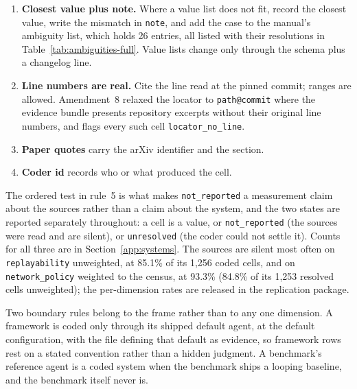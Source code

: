 \begin{enumerate}
\begin{enumerate}
    \texttt{medium} unless the documentation states the absence outright.
  \item \textbf{No, the evidence has no such place} (no config surface in the bundle, a truncated
    repository, or a paper only) $\rightarrow$ \texttt{not\_reported: true}, \texttt{value: null},
    and \texttt{note} names the place that was missing.
  \end{enumerate}
  The absence of a \emph{mention} is never evidence of absence: prose that does not discuss rollback
  is not evidence that rollback is absent. Equally, \texttt{not\_reported} is never correct once the
  place where the feature would be declared has been opened. This is the form rule~5 took under
  protocol amendment~9; the earlier form and the measured effect of the rewrite are reported in
  \S4.
\item \textbf{Closest value plus note.} Where a value list does not fit, record the closest value,
  write the mismatch in \texttt{note}, and add the case to the manual's ambiguity list, which holds
  26 entries, all listed with their resolutions in Table~\ref{tab:ambiguities-full}. Value lists change only through the schema plus a
  changelog line.
\item \textbf{Line numbers are real.} Cite the line read at the pinned commit; ranges are allowed.
  Amendment~8 relaxed the locator to \texttt{path@commit} where the evidence bundle presents
  repository excerpts without their original line numbers, and flags every such cell
  \texttt{locator\_no\_line}.
\item \textbf{Paper quotes} carry the arXiv identifier and the section.
\item \textbf{Coder id} records who or what produced the cell.
\end{enumerate}

The ordered test in rule~5 is what makes \texttt{not\_reported} a measurement claim about the
sources rather than a claim about the system, and the two states are reported separately throughout:
a cell is a value, or \texttt{not\_reported} (the sources were read and are silent), or
\texttt{unresolved} (the coder could not settle it). Counts for all three are in
Section~\ref{app:systems}. The sources are silent most often on \texttt{replayability} unweighted, at
85.1\% of its 1,256 coded cells, and on \texttt{network\_policy} weighted to the census, at 93.3\%
(84.8\% of its 1,253 resolved cells unweighted); the per-dimension rates are released in the replication
package.

Two boundary rules belong to the frame rather than to any one dimension. A framework is coded only
through its shipped default agent, at the default configuration, with the file defining that default as
evidence, so framework rows rest on a stated convention rather than a hidden judgment. A benchmark's
reference agent is a coded system when the benchmark ships a looping baseline, and the benchmark itself
never is.

